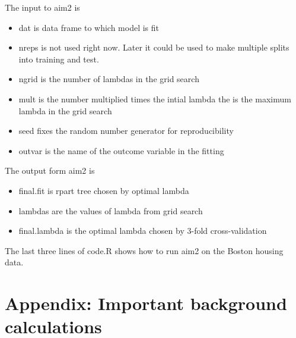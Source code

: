 \documentclass[12pt]{article}
\begin{document}
The input to aim2 is
\begin{itemize}
\item dat is data frame to which model is fit
\item nreps is not used right now.  Later it could be used to make
  multiple splits into training and test.
\item ngrid is the number of lambdas in the grid search
\item mult is the number multiplied times the intial lambda the is the
  maximum lambda in the grid search
\item seed fixes the random number generator for reproducibility
\item outvar is the name of the outcome variable in the fitting
\end{itemize}  

The output form aim2 is
\begin{itemize}
\item final.fit is rpart tree chosen by optimal lambda
\item lambdas are the values of lambda from grid search
\item final.lambda is the optimal lambda chosen by 3-fold cross-validation
\end{itemize}
The last three lines of code.R shows how to run aim2 on the Boston
housing data.


\section{Appendix: Important background calculations}
\label{bkgrnd}
\end{document}
